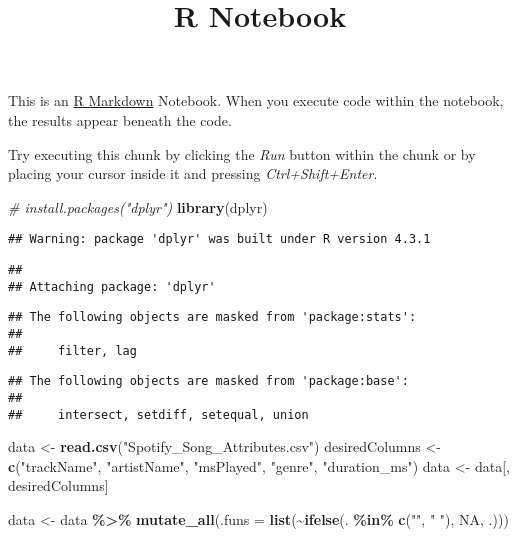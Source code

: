 \documentclass[
]{article}
\title{R Notebook}
\author{}
\date{\vspace{-2.5em}}
\newenvironment{Shaded}{\begin{snugshade}}{\end{snugshade}}
\newcommand{\AttributeTok}[1]{\textcolor[rgb]{0.13,0.29,0.53}{#1}}
\newcommand{\CommentTok}[1]{\textcolor[rgb]{0.56,0.35,0.01}{\textit{#1}}}
\newcommand{\ConstantTok}[1]{\textcolor[rgb]{0.56,0.35,0.01}{#1}}
\newcommand{\FunctionTok}[1]{\textcolor[rgb]{0.13,0.29,0.53}{\textbf{#1}}}
\newcommand{\NormalTok}[1]{#1}
\newcommand{\OtherTok}[1]{\textcolor[rgb]{0.56,0.35,0.01}{#1}}
\newcommand{\SpecialCharTok}[1]{\textcolor[rgb]{0.81,0.36,0.00}{\textbf{#1}}}
\newcommand{\StringTok}[1]{\textcolor[rgb]{0.31,0.60,0.02}{#1}}
\begin{document}
\maketitle

This is an \href{http://rmarkdown.rstudio.com}{R Markdown} Notebook.
When you execute code within the notebook, the results appear beneath
the code.

Try executing this chunk by clicking the \emph{Run} button within the
chunk or by placing your cursor inside it and pressing
\emph{Ctrl+Shift+Enter}.

\begin{Shaded}
\begin{Highlighting}[]
\CommentTok{\# install.packages("dplyr")}
\FunctionTok{library}\NormalTok{(dplyr)}
\end{Highlighting}
\end{Shaded}

\begin{verbatim}
## Warning: package 'dplyr' was built under R version 4.3.1
\end{verbatim}

\begin{verbatim}
## 
## Attaching package: 'dplyr'
\end{verbatim}

\begin{verbatim}
## The following objects are masked from 'package:stats':
## 
##     filter, lag
\end{verbatim}

\begin{verbatim}
## The following objects are masked from 'package:base':
## 
##     intersect, setdiff, setequal, union
\end{verbatim}

\begin{Shaded}
\begin{Highlighting}[]
\NormalTok{data }\OtherTok{\textless{}{-}} \FunctionTok{read.csv}\NormalTok{(}\StringTok{"Spotify\_Song\_Attributes.csv"}\NormalTok{)}
\NormalTok{desiredColumns }\OtherTok{\textless{}{-}} \FunctionTok{c}\NormalTok{(}\StringTok{"trackName"}\NormalTok{, }\StringTok{"artistName"}\NormalTok{, }\StringTok{"msPlayed"}\NormalTok{, }\StringTok{"genre"}\NormalTok{, }\StringTok{"duration\_ms"}\NormalTok{)}
\NormalTok{data }\OtherTok{\textless{}{-}}\NormalTok{ data[, desiredColumns]}
\end{Highlighting}
\end{Shaded}

\begin{Shaded}
\begin{Highlighting}[]
\NormalTok{data }\OtherTok{\textless{}{-}}\NormalTok{ data }\SpecialCharTok{\%\textgreater{}\%}
  \FunctionTok{mutate\_all}\NormalTok{(}\AttributeTok{.funs =} \FunctionTok{list}\NormalTok{(}\SpecialCharTok{\textasciitilde{}}\FunctionTok{ifelse}\NormalTok{(. }\SpecialCharTok{\%in\%} \FunctionTok{c}\NormalTok{(}\StringTok{""}\NormalTok{, }\StringTok{" "}\NormalTok{), }\ConstantTok{NA}\NormalTok{, .)))}
\end{Highlighting}
\end{Shaded}
\end{document}
